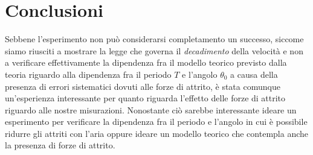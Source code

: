 \documentclass{article}
\begin{document}
\section{Conclusioni}
Sebbene l'esperimento non può considerarsi completamento un successo, siccome siamo riusciti a mostrare la legge che governa il \emph{decadimento} della velocità e non a verificare effettivamente la dipendenza fra il modello teorico previsto dalla teoria riguardo alla dipendenza fra il periodo $T$ e l'angolo $\theta_0$ a causa della presenza di errori sistematici dovuti alle forze di attrito, è stata comunque un'esperienza interessante per quanto riguarda l'effetto delle forze di attrito riguardo alle nostre misurazioni. Nonostante ciò sarebbe interessante ideare un esperimento per verificare la dipendenza fra il periodo e l'angolo in cui è possibile ridurre gli attriti con l'aria oppure ideare un modello teorico che contempla anche la presenza di forze di attrito.
\end{document}

